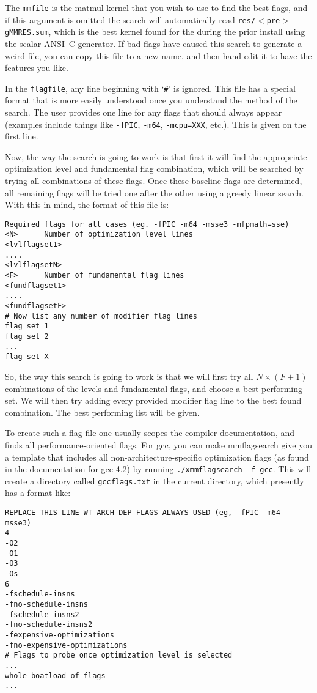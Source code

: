 \documentclass[11pt]{article}
\begin{document}
The {\tt mmfile} is the matmul kernel that you wish to use to find the
best flags, and if this argument is omitted the search will automatically
read {\tt res/$<$pre$>$gMMRES.sum}, which is the best kernel found for the
during the prior install using the scalar ANSI~C generator.  If bad flags
have caused this search to generate a weird file, you can copy this file
to a new name, and then hand edit it to have the features you like.

In the {\tt flagfile}, any line beginning with `\verb+#+' is ignored.
This file has a special format that is more easily understood once 
you understand the method of the search.  The user provides one line
for any flags that should always appear (examples include things like
{\tt -fPIC}, {\tt -m64}, {\tt -mcpu=XXX}, etc.).  This is given on the
first line.

Now, the way the search is going to work is that first it will find
the appropriate optimization level and fundamental flag combination,
which will be searched by trying all combinations of these flags.
Once these baseline flags are determined, all remaining flags will
be tried one after the other using a greedy linear search.
With this in mind, the format of this file is:
\begin{verbatim}
Required flags for all cases (eg. -fPIC -m64 -msse3 -mfpmath=sse)
<N>      Number of optimization level lines
<lvlflagset1>
....
<lvlflagsetN>
<F>      Number of fundamental flag lines
<fundflagset1>
....
<fundflagsetF>
# Now list any number of modifier flag lines
flag set 1
flag set 2
...
flag set X
\end{verbatim}

So, the way this search is going to work is that we will first try all
$N \times (F+1)$ combinations of the levels and fundamental flags, and
choose a best-performing set.  We will then try adding every provided modifier
flag line to the best found combination.  The best performing list will be 
given.  

To create such a flag file one usually scopes the compiler documentation, 
and finds all performance-oriented flags.  For gcc, you can make mmflagsearch
give you a template that includes all non-architecture-specific optimization
flags (as found in the documentation for gcc 4.2)
by running {\tt ./xmmflagsearch -f gcc}.  This will create a directory
called {\tt gccflags.txt} in the current directory, which presently has
a format like:
\begin{verbatim}
REPLACE THIS LINE WT ARCH-DEP FLAGS ALWAYS USED (eg, -fPIC -m64 -msse3)
4
-O2
-O1
-O3
-Os
6
-fschedule-insns 
-fno-schedule-insns 
-fschedule-insns2
-fno-schedule-insns2
-fexpensive-optimizations
-fno-expensive-optimizations
# Flags to probe once optimization level is selected
...
whole boatload of flags
...
\end{verbatim}
\end{document}
